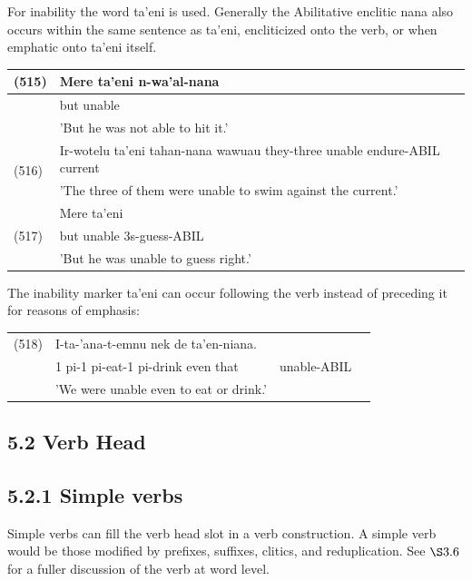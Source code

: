 \documentclass[10pt]{article}
\begin{document}
For inability the word ta'eni is used. Generally the Abilitative enclitic nana also occurs within the same sentence as ta'eni, encliticized onto the verb, or when emphatic onto ta'eni itself.

\begin{center}
\begin{tabular}{|l|l|}
\hline
\multirow[t]{3}{*}{(515)} & Mere ta'eni n-wa'al-nana \\
\hline
 & but unable \\
\hline
 & 'But he was not able to hit it.' \\
\hline
\multirow[t]{3}{*}{(516)} & \multirow{2}{*}{Ir-wotelu ta'eni tahan-nana wawuau they-three unable endure-ABIL current} \\
\hline
 &  \\
\hline
 & 'The three of them were unable to swim against the current.' \\
\hline
\multirow[t]{3}{*}{(517)} & Mere ta'eni \\
\hline
 & but unable 3s-guess-ABIL \\
\hline
 & 'But he was unable to guess right.' \\
\hline
\end{tabular}
\end{center}

The inability marker ta'eni can occur following the verb instead of preceding it for reasons of emphasis:

\begin{center}
\begin{tabular}{llll}
(518) & I-ta-'ana-t-emnu nek de ta'en-niana. &  \\
 & 1 pi-1 pi-eat-1 pi-drink even that & unable-ABIL \\
 & 'We were unable even to eat or drink.' &  \\
\end{tabular}
\end{center}

\subsection*{5.2 Verb Head}
\subsection*{5.2.1 Simple verbs}
Simple verbs can fill the verb head slot in a verb construction. A simple verb would be those modified by prefixes, suffixes, clitics, and reduplication. See \(\S 3.6\) for a fuller discussion of the verb at word level.
\end{document}
